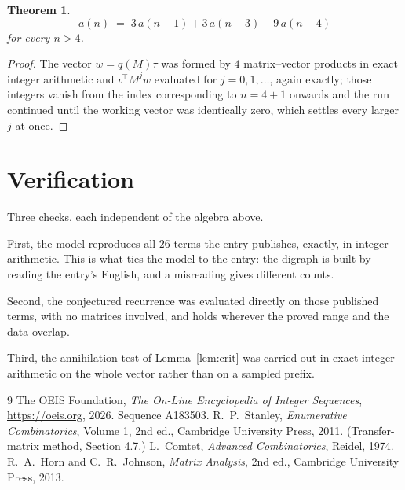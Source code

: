 \documentclass[11pt,a4paper]{article}
\theoremstyle{plain}
\newtheorem{theorem}{Theorem}
\theoremstyle{definition}
\begin{document}
\begin{theorem}
\[
a(n)\;=\;3\,a(n-1) + 3\,a(n-3) - 9\,a(n-4)
\]
for every $n>4$.
\end{theorem}

\begin{proof}
The vector $w=q(M)\tau$ was formed by $4$ matrix--vector products in exact integer
arithmetic and $\iota^{\!\top}M^{j}w$ evaluated for $j=0,1,\dots$, again exactly; those
integers vanish from the index corresponding to $n=4+1$ onwards and the run continued
until the working vector was identically zero, which settles every larger $j$ at once.
\end{proof}

\section{Verification}

Three checks, each independent of the algebra above.

First, the model reproduces all $26$ terms the entry publishes, exactly, in integer
arithmetic. This is what ties the model to the entry: the digraph is built by reading the
entry's English, and a misreading gives different counts.

Second, the conjectured recurrence was evaluated directly on those published terms, with no
matrices involved, and holds wherever the proved range and the data overlap.

Third, the annihilation test of Lemma~\ref{lem:crit} was carried out in exact integer
arithmetic on the whole vector rather than on a sampled prefix.

\begin{thebibliography}{9}
 The OEIS Foundation, \emph{The On-Line Encyclopedia of Integer
Sequences}, \url{https://oeis.org}, 2026. Sequence A183503.
 R.~P.~Stanley, \emph{Enumerative Combinatorics}, Volume 1, 2nd ed.,
Cambridge University Press, 2011. (Transfer-matrix method, Section 4.7.)
 L.~Comtet, \emph{Advanced Combinatorics}, Reidel, 1974.
 R.~A.~Horn and C.~R.~Johnson, \emph{Matrix Analysis}, 2nd ed., Cambridge
University Press, 2013.
\end{thebibliography}
\end{document}
